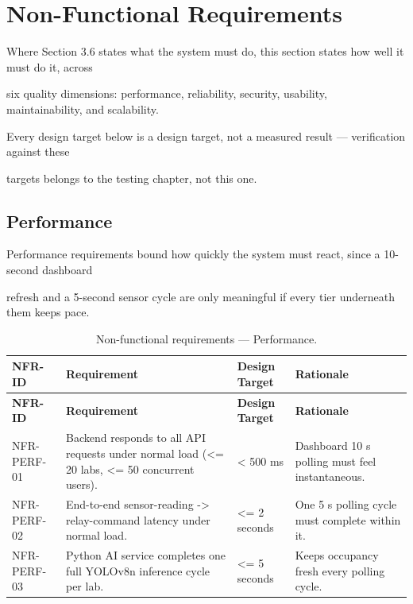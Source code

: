 \section{Non-Functional Requirements}
Where Section 3.6 states what the system must do, this section states how well it must do it, across

six quality dimensions: performance, reliability, security, usability, maintainability, and scalability.

Every design target below is a design target, not a measured result --- verification against these

targets belongs to the testing chapter, not this one.


\subsection{Performance}
Performance requirements bound how quickly the system must react, since a 10-second dashboard

refresh and a 5-second sensor cycle are only meaningful if every tier underneath them keeps pace.

\begin{longtable}{|L{2.5cm}|L{5.0cm}|L{3.2cm}|L{4.0cm}|}
	\caption{Non-functional requirements --- Performance.} \label{tab:3-16}                                                                                                                   \\
	\hline
	\textbf{NFR-ID} & \textbf{Requirement}                                                                         & \textbf{Design Target} & \textbf{Rationale}                              \\
	\hline
	\endfirsthead
	\hline
	\textbf{NFR-ID} & \textbf{Requirement}                                                                         & \textbf{Design Target} & \textbf{Rationale}                              \\
	\hline
	\endhead
	\hline
	\endfoot
	\hline
	\endlastfoot
	NFR-PERF-01     & Backend responds to all API requests under normal load (<= 20 labs, <= 50 concurrent users). & < 500 ms               & Dashboard 10 s polling must feel instantaneous. \\
	\hline
	NFR-PERF-02     & End-to-end sensor-reading -> relay-command latency under normal load.                        & <= 2 seconds           & One 5 s polling cycle must complete within it.  \\
	\hline
	NFR-PERF-03     & Python AI service completes one full YOLOv8n inference cycle per lab.                        & <= 5 seconds           & Keeps occupancy fresh every polling cycle.      \\
	\hline
\end{longtable}


